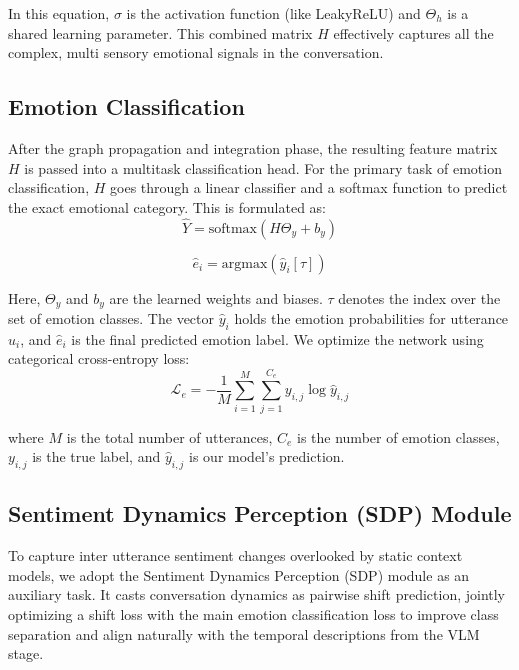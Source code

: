 \documentclass[runningheads]{llncs}
\begin{document}
\noindent In this equation, $\sigma$ is the activation function (like LeakyReLU) and $\Theta_h$ is a shared learning parameter. This combined matrix $H$ effectively captures all the complex, multi sensory emotional signals in the conversation.

\subsection{Emotion Classification}

After the graph propagation and integration phase, the resulting feature matrix $H$ is passed into a multitask classification head.
For the primary task of emotion classification, $H$ goes through a linear classifier and a softmax function to predict the exact emotional category. This is formulated as:
\begin{equation}
  \hat{Y} = \text{softmax}(H\Theta_y + b_y)
\end{equation}

\begin{equation}
  \hat{e}_i = \text{argmax}(\hat{y}_i[\tau])
\end{equation}

\noindent Here, $\Theta_y$ and $b_y$ are the learned weights and biases. $\tau$ denotes the index over the set of emotion classes. The vector $\hat{y}_i$ holds the emotion probabilities for utterance $u_i$, and $\hat{e}_i$ is the final predicted emotion label. We optimize the network using categorical cross-entropy loss:
\begin{equation}
  \mathcal{L}_e = -\frac{1}{M} \sum_{i=1}^{M} \sum_{j=1}^{C_e} y_{i,j} \log \hat{y}_{i,j}
\end{equation}

\noindent where $M$ is the total number of utterances, $C_e$ is the number of emotion classes, $y_{i,j}$ is the true label, and $\hat{y}_{i,j}$ is our model's prediction.

\subsection{Sentiment Dynamics Perception (SDP) Module}
To capture inter utterance sentiment changes overlooked by static context models, we adopt the Sentiment Dynamics Perception (SDP) module \cite{li2024graphsmile} as an auxiliary task. It casts conversation dynamics as pairwise shift prediction, jointly optimizing a shift loss with the main emotion classification loss to improve class separation and align naturally with the temporal descriptions from the VLM stage.
\end{document}
